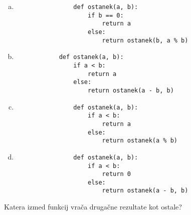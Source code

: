 \documentclass[arhiv, 10pt]{../izpit}
\begin{document}
        \begin{multicols}{2}
        \begin{enumerate}[(a)]
\item 
                \begin{verbatim}
                def ostanek(a, b):
                    if b == 0:
                        return a
                    else:
                        return ostanek(b, a % b)
                \end{verbatim}
            
\item 
            \begin{verbatim}
            def ostanek(a, b):
                if a < b:
                    return a
                else:
                    return ostanek(a - b, b)
            \end{verbatim}
        
\item 
                \begin{verbatim}
                def ostanek(a, b):
                    if a < b:
                        return a
                    else:
                        return ostanek(a % b)
                \end{verbatim}
            
\item 
                \begin{verbatim}
                def ostanek(a, b):
                    if a < b:
                        return 0
                    else:
                        return ostanek(a - b, b)
                \end{verbatim}
            
\end{enumerate}

        \end{multicols}
    
        \naloga*
        
        Katera izmed funkcij vrača drugačne rezultate kot ostale?
    
\end{document}
